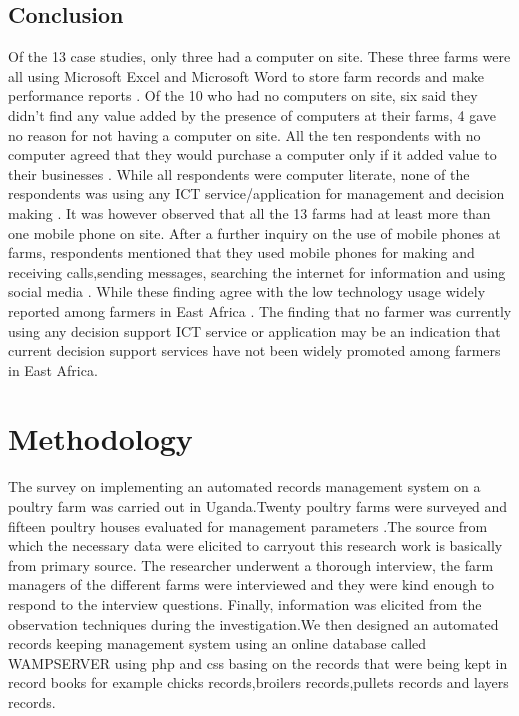 \documentclass{article}
\begin{document}
\subsection{Conclusion}
Of the 13 case studies, only three  had a computer on site. These three farms were all
using Microsoft Excel and Microsoft Word to store farm records and make performance
reports \cite{r1}. Of the 10 who had no computers on site, six said they didn’t find any value added by the presence of computers at their farms, 4 gave no reason for not having a
computer on site. All the ten respondents  with no computer agreed that they would
purchase a computer only if it added value to their businesses \cite{r1}. While all respondents were computer literate, none of the respondents was using any ICT service/application for management and decision making \cite{r1}. It was however observed that all the 13 farms had at least more than one mobile phone on site. After a further inquiry on the use of mobile phones at farms, respondents mentioned that they used mobile phones for making and receiving calls,sending messages, searching the internet for information and using social media \cite{r1}. While these finding agree with the low technology usage widely reported among farmers in East Africa \cite{r3}. The finding that no farmer was currently using any decision support ICT service or application may be an indication that current decision support services have not been widely promoted among farmers in East Africa.
\section{Methodology}
The survey on implementing an automated records management system on a poultry farm was carried out in Uganda.Twenty poultry farms were surveyed and fifteen poultry houses evaluated for management parameters .The source from which the necessary data were elicited to carryout this research work is basically from primary source. The researcher underwent a thorough interview, the farm managers of the different farms were interviewed and they were kind enough to respond to the interview questions. Finally, information was elicited from the observation techniques during the investigation.We then designed an automated records keeping management system using an online database called WAMPSERVER using php and css basing on the  records that were being kept in record books for example chicks records,broilers records,pullets records and layers records.


\end{document}

